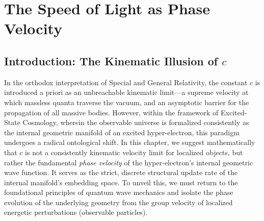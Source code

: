 \section{The Speed of Light as Phase Velocity}

\subsection{Introduction: The Kinematic Illusion of $c$}
In the orthodox interpretation of Special and General Relativity, the constant $c$ is introduced a priori as an unbreachable kinematic limit—a supreme velocity at which massless quanta traverse the vacuum, and an asymptotic barrier for the propagation of all massive bodies. However, within the framework of Excited-State Cosmology, wherein the observable universe is formalized consistently as the internal geometric manifold of an excited hyper-electron, this paradigm undergoes a radical ontological shift. In this chapter, we suggest mathematically that $c$ is not a consistently kinematic velocity limit for localized objects, but rather the fundamental \textit{phase velocity} of the hyper-electron's internal geometric wave function. It serves as the strict, discrete structural update rate of the internal manifold's embedding space. To unveil this, we must return to the foundational principles of quantum wave mechanics and isolate the phase evolution of the underlying geometry from the group velocity of localized energetic perturbations (observable particles). \cite{Robertson1935, Guth1982, Zeldovich1972}

